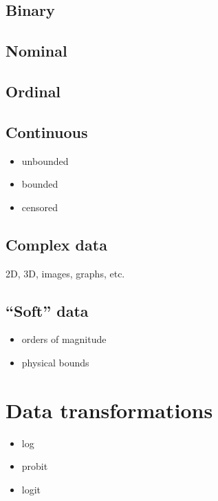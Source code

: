\documentclass[
  a4paper,
  DIV=11,
  numbers=noendperiod,
  oneside]{scrreprt}
\begin{document}
\hypertarget{binary}{%
\subsection{Binary}\label{binary}}

\hypertarget{nominal}{%
\subsection{Nominal}\label{nominal}}

\hypertarget{ordinal}{%
\subsection{Ordinal}\label{ordinal}}

\hypertarget{continuous}{%
\subsection{Continuous}\label{continuous}}

\begin{itemize}
\item
  unbounded
\item
  bounded
\item
  censored
\end{itemize}

\hypertarget{complex-data}{%
\subsection{Complex data}\label{complex-data}}

2D, 3D, images, graphs, etc.

\hypertarget{soft-data}{%
\subsection{``Soft'' data}\label{soft-data}}

\begin{itemize}
\item
  orders of magnitude
\item
  physical bounds
\end{itemize}

\hypertarget{data-transformations}{%
\section{Data transformations}\label{data-transformations}}

\begin{itemize}
\item
  log
\item
  probit
\item
  logit
\end{itemize}
\end{document}
